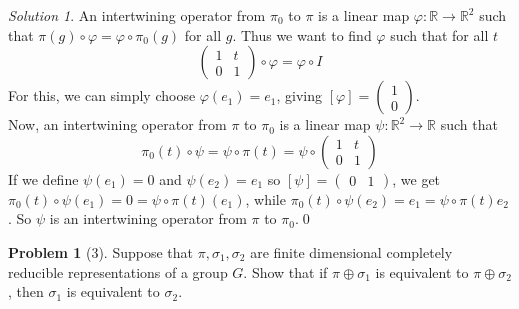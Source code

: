 \documentclass[reqno]{amsart}
\theoremstyle{definition}
\newtheorem{problem}[theorem]{Problem}
\theoremstyle{remark}
\newtheorem*{solution}{Solution}
\begin{document}
    \begin{solution}
        An intertwining operator from
        $\pi_0$ to $\pi$ is a linear map
        $\varphi \colon
        \mathbb{R} \to \mathbb{R}^2$ such that
        $\pi (g) \circ \varphi = \varphi \circ \pi_0 (g)$ for all
        $g$.
        Thus we want to find $\varphi $ such that for
        all $t$
        \[
            \begin{pmatrix} 1 & t \\
            0 & 1\end{pmatrix}  \circ \varphi 
            = \varphi \circ I
        \] 
        For this, we can
        simply choose
        $\varphi (e_1) = e_1$, giving
        $\left[ \varphi  \right] 
        = \begin{pmatrix} 1 \\ 0 \end{pmatrix} $.\\
        Now, an intertwining operator
        from $\pi$ to $\pi_0$ is a linear map
        $\psi \colon \mathbb{R}^2 \to \mathbb{R}$ such that
        \[
        \pi_0(t) \circ \psi = \psi \circ \pi(t)
        = \psi \circ \begin{pmatrix} 1 & t\\
        0 & 1\end{pmatrix} 
        \] 
        If we define $\psi (e_1) = 0$ and $\psi (e_2) = e_1$ so
        $\left[ \psi  \right] =
        \begin{pmatrix} 0 & 1 \end{pmatrix} $, we get
        $\pi_0(t) \circ \psi (e_1) = 0 = 
        \psi \circ \pi(t) (e_1)$, while
        $\pi_0(t) \circ \psi (e_2) = e_1 = 
        \psi \circ \pi(t) e_2$.
        So $\psi $ is an intertwining
        operator from
        $\pi$ to $\pi_0$.\qed
    \end{solution}

    \begin{problem}[3]
        Suppose that $\pi, \sigma_1, \sigma_2$ are finite
        dimensional completely reducible representations
        of a group $G$. Show that if
        $\pi \oplus \sigma_1$ is equivalent to
        $\pi \oplus \sigma_2$, then
        $\sigma_1$ is equivalent to $\sigma_2$.
    \end{problem}
\end{document}
